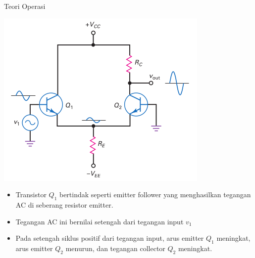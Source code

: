 \documentclass[aspectratio=169]{beamer}
\begin{document}
\begin{frame}{Teori Operasi}
	\begin{multicols}{2}
		\begin{center}
			\includegraphics[height=0.7\textheight]{gambar/01.diff-amp/01.noninverting-input+single-ended-output_AC}
		\end{center}
		\columnbreak
		\begin{itemize}
			\item Transistor $ Q_1 $ bertindak seperti emitter follower yang menghasilkan tegangan AC di seberang resistor emitter.
			\item Tegangan AC ini bernilai setengah dari tegangan input $ v_1 $
			\item Pada setengah siklus positif dari tegangan input, arus emitter $ Q_1 $ meningkat, arus emitter $ Q_2 $ menurun, dan tegangan collector $ Q_2 $ meningkat.
		\end{itemize}
	\end{multicols}
\end{frame}
\end{document}
